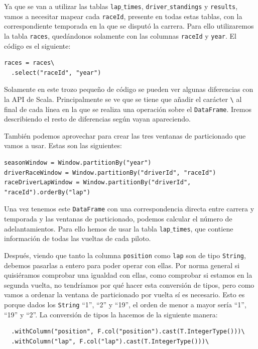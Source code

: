 \documentclass[12pt,twoside,titlepage]{report}
\newcommand{\quotes}[1]{``#1''}
\begin{document}
Ya que se van a utilizar las tablas \texttt{lap$\_$times}, \texttt{driver$\_$standings} y \texttt{results}, vamos a necesitar mapear cada \texttt{raceId}, presente en todas estas tablas, con la correspondiente temporada en la que se disputó la carrera. Para ello utilizaremos la tabla \texttt{races}, quedándonos solamente con las columnas \texttt{raceId} y \texttt{year}. El código es el siguiente:

\begin{lstlisting}
races = races\
  .select("raceId", "year")
\end{lstlisting}

Solamente en este trozo pequeño de código se pueden ver algunas diferencias con la API de Scala. Principalmente se ve que se tiene que añadir el carácter \texttt{\textbackslash} al final de cada línea en la que se realiza una operación sobre el \texttt{DataFrame}. Iremos describiendo el resto de diferencias según vayan apareciendo.

También podemos aprovechar para crear las tres ventanas de particionado que vamos a usar. Estas son las siguientes:

\begin{lstlisting}
seasonWindow = Window.partitionBy("year")
driverRaceWindow = Window.partitionBy("driverId", "raceId")
raceDriverLapWindow = Window.partitionBy("driverId", "raceId").orderBy("lap")
\end{lstlisting}

Una vez tenemos este \texttt{DataFrame} con una correspondencia directa entre carrera y temporada y las ventanas de particionado, podemos calcular el número de adelantamientos. Para ello hemos de usar la tabla \texttt{lap$\_$times}, que contiene información de todas las vueltas de cada piloto.

Después, viendo que tanto la columna \texttt{position} como \texttt{lap} son de tipo \texttt{String}, debemos pasarlas a entero para poder operar con ellas. Por norma general si quisiéramos comprobar una igualdad con ellas, como comprobar si estamos en la segunda vuelta, no tendríamos por qué hacer esta conversión de tipos, pero como vamos a ordenar la ventana de particionado por vuelta sí es necesario. Esto es porque dados los \texttt{String} \quotes{1}, \quotes{2} y \quotes{19}, el orden de menor a mayor sería \quotes{1}, \quotes{19} y \quotes{2}. La conversión de tipos la hacemos de la siguiente manera:

\begin{lstlisting}
  .withColumn("position", F.col("position").cast(T.IntegerType()))\
  .withColumn("lap", F.col("lap").cast(T.IntegerType()))\
\end{lstlisting}
\end{document}
